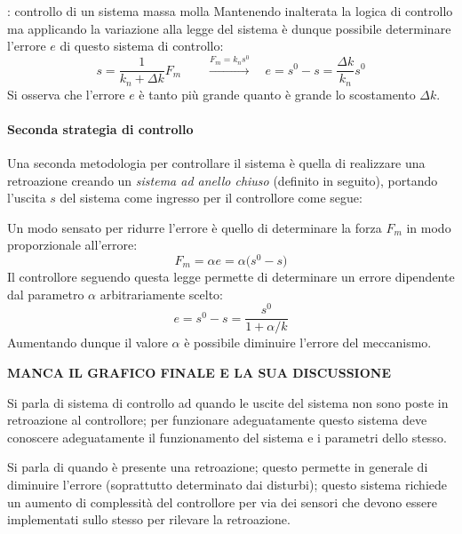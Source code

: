 \begin{esempio}{: controllo di un sistema massa molla}
		Mantenendo inalterata la logica di controllo ma applicando la variazione alla legge del sistema è dunque possibile determinare l'errore $e$ di questo sistema di controllo:
		\[  s = \frac{1}{k_n+\Delta k} F_m \qquad \xrightarrow{F_m = k_ns^0} \quad e =s^0-s = \frac{\Delta k}{k_n} s^0\]
		Si osserva che l'errore $e$ è tanto più grande quanto è grande lo scostamento $\Delta k$.
		
		\paragraph{Seconda strategia di controllo} Una seconda metodologia per controllare il sistema è quella di realizzare una retroazione creando un \textit{sistema ad anello chiuso} (definito in seguito), portando l'uscita $s$ del sistema come ingresso per il controllore come segue:
		
		\begin{center}
		\end{center}
		
		Un modo sensato per ridurre l'errore è quello di determinare la forza $F_m$ in modo proporzionale all'errore:
		\[ F_m = \alpha e = \alpha\big(s^0-s\big) \]
		Il controllore seguendo questa legge permette di determinare un errore dipendente dal parametro $\alpha$ arbitrariamente scelto:
		\[ e = s^0 - s = \frac{s^0}{1+\alpha/k}  \]
		Aumentando dunque il valore $\alpha$ è possibile diminuire l'errore del meccanismo.
		
		
		
		\textbf{MANCA IL GRAFICO FINALE E LA SUA DISCUSSIONE}
		
	\end{esempio}
	
	\begin{concetto}
		Si parla di sistema di controllo ad  quando le uscite del sistema non sono poste in retroazione al controllore; per funzionare adeguatamente questo sistema deve conoscere adeguatamente il funzionamento del sistema e i parametri dello stesso.
		
		Si parla di  quando è presente una retroazione; questo permette in generale di diminuire l'errore (soprattutto determinato dai disturbi); questo sistema richiede un aumento di complessità del controllore per via dei sensori che devono essere implementati sullo stesso per rilevare la retroazione.
	\end{concetto}
	
	
	
	
	
	
	
	
	
	
	
	
	
	
	
	
	
	
	
	
	
	
	
	
	
	
	
	
	
	
	
	
	
	
	